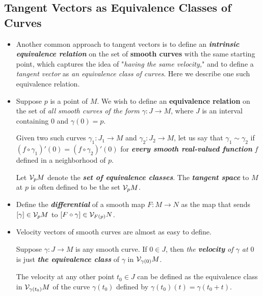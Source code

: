 \documentclass[11pt]{article}
\begin{document}
\subsection{Tangent Vectors as Equivalence Classes of Curves}
\begin{itemize}
\item Another common approach to tangent vectors is to define an \emph{\textbf{intrinsic equivalence relation}} on the set of \textbf{smooth curves} with the same starting point, which captures the idea of "\emph{having the same velocity,}" and to define a \emph{tangent vector} as \emph{an equivalence class of curves}. Here we describe one such equivalence relation.

\item \begin{definition}
Suppose $p$ is a point of $M$. We wish to define an \textbf{equivalence relation} on the set of \emph{all smooth curves of the form} $\gamma: J \rightarrow M$, where $J$ is an interval containing $0$ and $\gamma(0) = p$. 

Given two such curves $\gamma_1: J_1 \rightarrow M$ and $\gamma_2: J_2 \rightarrow M$, let us say that $\gamma_1 \sim \gamma_2$ if $(f \circ \gamma_1)'(0) = (f \circ \gamma_2)'(0)$ for \emph{\textbf{every smooth real-valued function}} $f$ defined in a neighborhood of $p$. 

Let ${\mathcal V}_{p}M$ denote the \emph{\textbf{set of equivalence classes}}. The \emph{\textbf{tangent space}} to $M$ at $p$ is often defined to be the set ${\mathcal V}_{p}M$.
\end{definition}

\item \begin{definition}
Define the \emph{\textbf{differential}} of a smooth map $F: M \rightarrow N$ as the map that sends $[\gamma] \in {\mathcal V}_{p}M$ to $[F\circ \gamma] \in {\mathcal V}_{F(p)}N$. 
\end{definition}

\item  Velocity vectors of smooth curves are almost as easy to define. 
\begin{definition}
Suppose $\gamma: J \rightarrow M$ is any smooth curve. If $0 \in J$, then \emph{the \textbf{velocity} of $\gamma$ at $0$} is just \emph{\textbf{the equivalence class}} of $\gamma$ in ${\mathcal V}_{\gamma(0)}M$. 

The velocity at any other point $t_0 \in J$ can be defined as the equivalence class in ${\mathcal V}_{\gamma(t_0)}M$ of the curve $\gamma(t_0)$ defined by $\gamma(t_0)(t) =  \gamma(t_0 + t)$. 
\end{definition}

\end{itemize}
\end{document}
